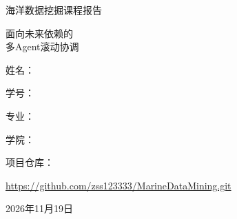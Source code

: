 \documentclass[degree=master,fontset=windows,oneside]{ustcthesis}
\begin{document}
\begin{titlepage}
\centering
\vspace*{2cm}
{\heiti 海洋数据挖掘课程报告\par}
\vspace{2cm}
{\heiti 面向未来依赖的\\多Agent滚动协调\par}
\vspace{0.8cm}
\vspace{2cm}
{ 姓名：\underline{}\par}
\vspace{0.5cm}
{ 学号：\underline{}\par}
\vspace{0.5cm}
{ 专业：\underline{}\par}
\vspace{0.5cm}
{ 学院：\underline{}\par}
\vfill
{ 项目仓库：\par}
\vspace{0.2cm}
{\small\url{https://github.com/zss123333/MarineDataMining.git}\par}
\vspace{0.8cm}
{ 2026年11月19日\par}
\end{titlepage}
\tableofcontents
\clearpage


\end{document}
